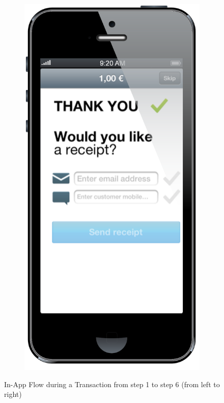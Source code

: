 \documentclass[a4paper, oneside]{csthesis}
\begin{document}
\begin{figure}
\begin{subfigure}[b]{0.12\textwidth}
                \includegraphics[width=\textwidth]{figures/flow6.png}
                \label{fig:flow6}
        \end{subfigure}
        \caption{In-App Flow during a Transaction from step 1 to step 6 (from left to right)}\label{fig:flow-customer}
\end{figure}
\end{document}

